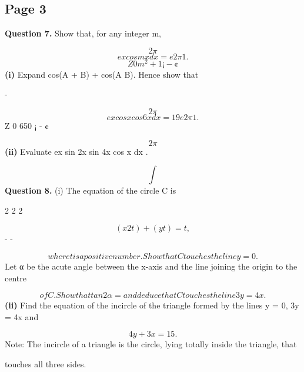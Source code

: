 \documentclass[12pt]{article}
\begin{document}
\subsection*{Page 3}
\begin{flushleft}
\bigskip\textbf{Question 7.} Show that, for any integer m,\par
\[2\pi\]
\[ex cos mx dx = e 2\pi 1 .\]
\[Z 0 m^2 + 1 ¡ - ¢\]
\textbf{(i)} Expand cos(A + B) + cos(A B). Hence show that\par
-\par
\[2\pi\]
\[ex cos x cos 6x dx = 19 e 2\pi 1 .\]
Z 0 650 ¡ - ¢\par
\[2\pi\]
\textbf{(ii)} Evaluate ex sin 2x sin 4x cos x dx .\par
\[\int\]
\bigskip\textbf{Question 8.} (i) The equation of the circle C is\par
2 2 2\par
\[(x 2t) + (y t) = t ,\]
- -\par
\[where t is a positive number. Show that C touches the line y = 0 .\]
Let α be the acute angle between the x-axis and the line joining the origin to the centre\par
\[of C. Show that tan 2α = and deduce that C touches the line 3y = 4x .\]
\textbf{(ii)} Find the equation of the incircle of the triangle formed by the lines y = 0, 3y = 4x and\par
\[4y + 3x = 15 .\]
Note: The incircle of a triangle is the circle, lying totally inside the triangle, that\par
touches all three sides.\par
\end{flushleft}
\end{document}
